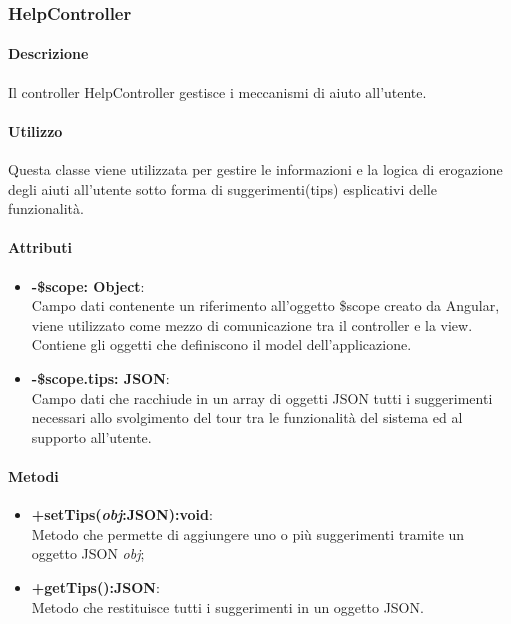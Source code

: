 \subsubsection*{HelpController}
      \paragraph{Descrizione}
	Il controller HelpController gestisce i meccanismi di aiuto all'utente.
	
	\paragraph{Utilizzo}
	Questa classe viene utilizzata per gestire le informazioni e la logica di erogazione degli aiuti all'utente sotto forma di suggerimenti(tips) esplicativi delle funzionalità.
	
	\paragraph{Attributi}
	\begin{itemize}
		\item \textbf{-\$scope: Object}:\\
				Campo dati contenente un riferimento all'oggetto \$scope creato da Angular, viene utilizzato come mezzo di comunicazione tra il controller e la view. Contiene gli oggetti che definiscono il model dell'applicazione.
		\item \textbf{-\$scope.tips: JSON}:\\
				Campo dati che racchiude in un array di oggetti JSON tutti i suggerimenti necessari allo svolgimento del tour tra le funzionalità del sistema ed al supporto all'utente. 
	\end{itemize}
	
	\paragraph{Metodi}
	\begin{itemize}
	  \item \textbf{+setTips(\textit{obj}:JSON):void}:\\
		  Metodo che permette di aggiungere uno o più suggerimenti tramite un oggetto JSON \textit{obj};
	  \item \textbf{+getTips():JSON}:\\
		  Metodo che restituisce tutti i suggerimenti in un oggetto JSON.
	\end{itemize}
